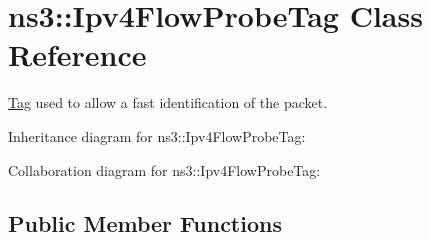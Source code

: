 \hypertarget{classns3_1_1Ipv4FlowProbeTag}{}\section{ns3\+:\+:Ipv4\+Flow\+Probe\+Tag Class Reference}
\label{classns3_1_1Ipv4FlowProbeTag}


\hyperlink{classns3_1_1Tag}{Tag} used to allow a fast identification of the packet.  




Inheritance diagram for ns3\+:\+:Ipv4\+Flow\+Probe\+Tag\+:


Collaboration diagram for ns3\+:\+:Ipv4\+Flow\+Probe\+Tag\+:
\subsection*{Public Member Functions}
